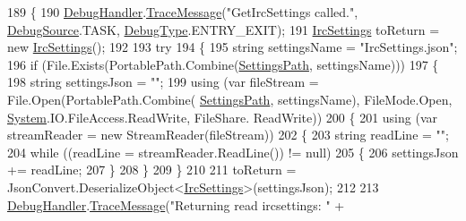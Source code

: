 \begin{DoxyCode}
189         \{
190             \mbox{\hyperlink{class_little_weeb_library_1_1_handlers_1_1_settings_handler_a80da61f3a3fcbb5f9ac6057591a98acf}{DebugHandler}}.\mbox{\hyperlink{interface_little_weeb_library_1_1_handlers_1_1_i_debug_handler_a2e405bc3492e683cd3702fae125221bc}{TraceMessage}}(\textcolor{stringliteral}{"GetIrcSettings called."}, 
      \mbox{\hyperlink{namespace_little_weeb_library_1_1_handlers_a2a6ca0775121c9c503d58aa254d292be}{DebugSource}}.TASK, \mbox{\hyperlink{namespace_little_weeb_library_1_1_handlers_ab66019ed40462876ec4e61bb3ccb0a62}{DebugType}}.ENTRY\_EXIT);
191             \mbox{\hyperlink{class_little_weeb_library_1_1_settings_1_1_irc_settings}{IrcSettings}} toReturn = \textcolor{keyword}{new} \mbox{\hyperlink{class_little_weeb_library_1_1_settings_1_1_irc_settings}{IrcSettings}}();
192 
193             \textcolor{keywordflow}{try}
194             \{
195                 \textcolor{keywordtype}{string} settingsName = \textcolor{stringliteral}{"IrcSettings.json"};
196                 \textcolor{keywordflow}{if} (File.Exists(PortablePath.Combine(\mbox{\hyperlink{class_little_weeb_library_1_1_handlers_1_1_settings_handler_a2e309fc6b949f0bb7e7ace8c2017be7f}{SettingsPath}}, settingsName)))
197                 \{
198                     \textcolor{keywordtype}{string} settingsJson = \textcolor{stringliteral}{""};
199                     \textcolor{keyword}{using} (var fileStream = File.Open(PortablePath.Combine(
      \mbox{\hyperlink{class_little_weeb_library_1_1_handlers_1_1_settings_handler_a2e309fc6b949f0bb7e7ace8c2017be7f}{SettingsPath}}, settingsName), FileMode.Open, \mbox{\hyperlink{namespace_system}{System}}.IO.FileAccess.ReadWrite, FileShare.
      ReadWrite))
200                     \{
201                         \textcolor{keyword}{using} (var streamReader = \textcolor{keyword}{new} StreamReader(fileStream))
202                         \{
203                             \textcolor{keywordtype}{string} readLine = \textcolor{stringliteral}{""};
204                             \textcolor{keywordflow}{while} ((readLine = streamReader.ReadLine()) != null)
205                             \{
206                                 settingsJson += readLine;
207                             \}
208                         \}
209                     \}
210 
211                     toReturn = JsonConvert.DeserializeObject<\mbox{\hyperlink{class_little_weeb_library_1_1_settings_1_1_irc_settings}{IrcSettings}}>(settingsJson);
212 
213                     \mbox{\hyperlink{class_little_weeb_library_1_1_handlers_1_1_settings_handler_a80da61f3a3fcbb5f9ac6057591a98acf}{DebugHandler}}.\mbox{\hyperlink{interface_little_weeb_library_1_1_handlers_1_1_i_debug_handler_a2e405bc3492e683cd3702fae125221bc}{TraceMessage}}(\textcolor{stringliteral}{"Returning read ircsettings: "} + 

\end{DoxyCode}

